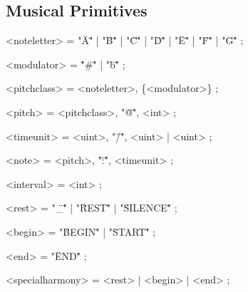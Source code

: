 \documentclass{article}
\begin{document}
\subsection{Musical Primitives}
\begin{grammar}
<noteletter> = "\"A\"" | "\"B\"" | "\"C\"" |  "\"D\"" | "\"E\"" | "\"F\"" |  "\"G\"" ;

<modulator> = "\"#\"" | "\"b\"" ; %

<pitchclass> = <noteletter>, \{<modulator>\} ;

<pitch> = <pitchclass>, "\"@\"", <int> ;

<timeunit> = <uint>, "\"/\"", <uint> | <uint> ;

<note> = <pitch>, "\":\"", <timeunit> ;






<interval> = <int> ;

<rest> = "\"\_\"" | "\"REST\"" | "\"SILENCE\"" ;

<begin> = "\"BEGIN\"" | "\"START\"" ;

<end> = "\"END\"" ;

<specialharmony> = <rest> | <begin> | <end> ; %


\end{grammar}
\end{document}
